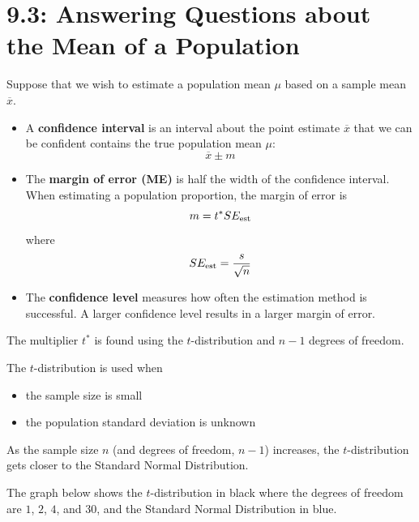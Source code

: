 \documentclass[../mathNotesPreamble]{subfiles}
\begin{document}
  \section{9.3: Answering Questions about the Mean of a Population}
    \begin{defn*}
      Suppose that we wish to estimate a population mean $\mu$ based on a sample mean $\overline{x}$.
      \begin{itemize}
        \item A \textbf{confidence interval} is an interval about the point estimate $\overline{x}$ that we can be confident contains the true population mean $\mu$:
          \[\overline{x}\pm m\]
        \item The \textbf{margin of error (ME)} is half the width of the confidence interval. When estimating a population proportion, the margin of error is
          \[m=t^* SE_{\textnormal{est}}\]
          where
          \[SE_{\textnormal{est}}=\frac{s}{\sqrt{n}}\]
        \item The \textbf{confidence level} measures how often the estimation method is successful. A larger confidence level results in a larger margin of error.
      \end{itemize}
    \end{defn*}
    \vspace*{2\baselineskip}

    The multiplier $t^*$ is found using the $t$-distribution and $n-1$ degrees of freedom.
    \pagebreak

    The $t$-distribution is used when
    \begin{itemize}
      \item the sample size is small %
      \item the population standard deviation is unknown
    \end{itemize}
    As the sample size $n$ (and degrees of freedom, $n-1$) increases, the $t$-distribution gets closer to the Standard Normal Distribution.

    The graph below shows the $t$-distribution in black where the degrees of freedom are $1$, $2$, $4$, and $30$, and the Standard Normal Distribution in blue.
\end{document}
